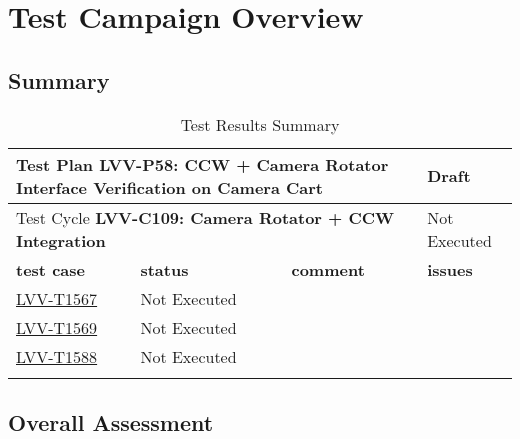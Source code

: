 \documentclass[SE,lsstdraft,STR,toc]{lsstdoc}
\begin{document}
\newpage

\section{Test Campaign Overview}
\label{sect:overview}

\subsection{Summary}
\label{sect:summarytable}

\begin{longtable}{p{2cm}p{2.5cm}p{9cm}p{2.5cm}}
\toprule
\multicolumn{3}{l}{ Test Plan {\bf LVV-P58: CCW + Camera Rotator Interface Verification on Camera Cart
 }} & Draft \\\hline

  \multicolumn{3}{l}{ Test Cycle {\bf LVV-C109: Camera Rotator + CCW Integration
 }} & Not Executed \\\hline

  {\bf \footnotesize test case} & {\bf \footnotesize status} & {\bf \footnotesize comment} & {\bf \footnotesize issues} \\\toprule

    \href{https://jira.lsstcorp.org/secure/Tests.jspa#/testCase/LVV-T1567}{LVV-T1567}
    & Not Executed &
    \begin{minipage}[]{9cm}
    \smallskip
    
    \medskip
    \end{minipage}
    &
    \\\hline
    \href{https://jira.lsstcorp.org/secure/Tests.jspa#/testCase/LVV-T1569}{LVV-T1569}
    & Not Executed &
    \begin{minipage}[]{9cm}
    \smallskip
    
    \medskip
    \end{minipage}
    &
    \\\hline
    \href{https://jira.lsstcorp.org/secure/Tests.jspa#/testCase/LVV-T1588}{LVV-T1588}
    & Not Executed &
    \begin{minipage}[]{9cm}
    \smallskip
    
    \medskip
    \end{minipage}
    &
    \\\hline
\caption{Test Results Summary}
\label{table:summary}
\end{longtable}

\subsection{Overall Assessment}
\label{sect:overallassessment}
\end{document}
